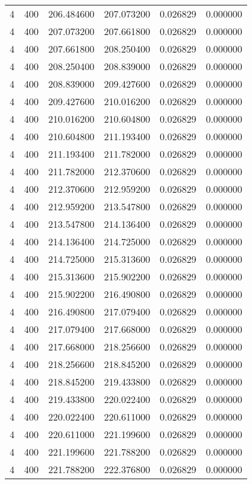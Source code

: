 \begin{longtable}{rrrrrr}
4 & 400 & 206.484600 & 207.073200 & 0.026829 & 0.000000 \\
4 & 400 & 207.073200 & 207.661800 & 0.026829 & 0.000000 \\
4 & 400 & 207.661800 & 208.250400 & 0.026829 & 0.000000 \\
4 & 400 & 208.250400 & 208.839000 & 0.026829 & 0.000000 \\
4 & 400 & 208.839000 & 209.427600 & 0.026829 & 0.000000 \\
4 & 400 & 209.427600 & 210.016200 & 0.026829 & 0.000000 \\
4 & 400 & 210.016200 & 210.604800 & 0.026829 & 0.000000 \\
4 & 400 & 210.604800 & 211.193400 & 0.026829 & 0.000000 \\
4 & 400 & 211.193400 & 211.782000 & 0.026829 & 0.000000 \\
4 & 400 & 211.782000 & 212.370600 & 0.026829 & 0.000000 \\
4 & 400 & 212.370600 & 212.959200 & 0.026829 & 0.000000 \\
4 & 400 & 212.959200 & 213.547800 & 0.026829 & 0.000000 \\
4 & 400 & 213.547800 & 214.136400 & 0.026829 & 0.000000 \\
4 & 400 & 214.136400 & 214.725000 & 0.026829 & 0.000000 \\
4 & 400 & 214.725000 & 215.313600 & 0.026829 & 0.000000 \\
4 & 400 & 215.313600 & 215.902200 & 0.026829 & 0.000000 \\
4 & 400 & 215.902200 & 216.490800 & 0.026829 & 0.000000 \\
4 & 400 & 216.490800 & 217.079400 & 0.026829 & 0.000000 \\
4 & 400 & 217.079400 & 217.668000 & 0.026829 & 0.000000 \\
4 & 400 & 217.668000 & 218.256600 & 0.026829 & 0.000000 \\
4 & 400 & 218.256600 & 218.845200 & 0.026829 & 0.000000 \\
4 & 400 & 218.845200 & 219.433800 & 0.026829 & 0.000000 \\
4 & 400 & 219.433800 & 220.022400 & 0.026829 & 0.000000 \\
4 & 400 & 220.022400 & 220.611000 & 0.026829 & 0.000000 \\
4 & 400 & 220.611000 & 221.199600 & 0.026829 & 0.000000 \\
4 & 400 & 221.199600 & 221.788200 & 0.026829 & 0.000000 \\
4 & 400 & 221.788200 & 222.376800 & 0.026829 & 0.000000 \\

\end{longtable}
